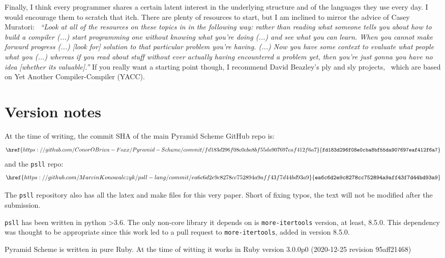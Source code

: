 \documentclass[aip,jcp,reprint,footinbib]{revtex4-1}
\let\tt\texttt
\newcommand\psll{\texttt{psll}\xspace}
\begin{document}
Finally, I think every programmer shares a certain latent interest in the underlying structure and of the languages they use every day. I would encourage them to scratch that itch. There are plenty of resources to start, but I am inclined to mirror the advice of Casey Muratori:~\cite{blow2020qna} \textit{\enquote{Look at all of the resources on these topics in in the following way: rather than reading what someone tells you about how to build a compiler (...) start programming one without knowing what you're doing (...) and see what you can learn. When you cannot make forward progress (...) [look for] solution to that particular problem you're having. (...) Now you have some context to evaluate what people what you (...) whereas if you read about stuff without ever actually having encountered a problem yet, then you're just gonna you have no idea [whether its valuable].}} If you really want a starting point though, I recommend David Beazley's ply and sly projects,~\cite{dbeaz2018,sly,ply} which are based on Yet Another Compiler-Compiler (YACC).\cite{levine1992}

\section*{Version notes}

\setlength{\abovedisplayskip}{3pt}
\setlength{\belowdisplayskip}{3pt}

At the time of writing, the commit SHA of the main Pyramid Scheme GitHub repo\cite{pyra_git} is:
\[
    \href{https://github.com/ConorOBrien-Foxx/Pyramid-Scheme/commit/fd183d296f08e0cba8bf55da907697eaf412f6a7}{\tt{fd183d296f08e0cba8bf55da907697eaf412f6a7}}
\]
and the \psll repo:\cite{psll_git}
\[
    \href{https://github.com/MarcinKonowalczyk/psll-lang/commit/ea6c6d2e9c8278cc752894a9aff43f7d44bd93a9}{\tt{ea6c6d2e9c8278cc752894a9aff43f7d44bd93a9}}
\]

The \psll repository also has all the latex and make files for this very paper. Short of fixing typos, the text will not be modified after the submission.

\psll has been written in python >3.6. The only non-core library it depends on is \tt{more-itertools} version, at least, 8.5.0. This dependency was thought to be appropriate since this work led to a pull request to \tt{more-itertools}, added in version 8.5.0.\cite{more_itertools}

Pyramid Scheme is written in pure Ruby. At the time of witting it works in Ruby version 3.0.0p0 (2020-12-25 revision 95aff21468)
\end{document}
